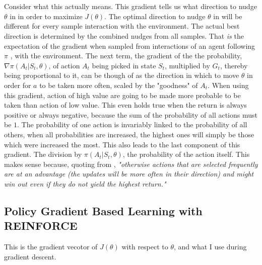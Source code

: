 \noindent
\\ \\ Consider what this actually means. This gradient tells us what direction to nudge $\theta$ in in order to maximize $J(\theta)$. The optimal direction to nudge $\theta$ in will be different for every sample interaction with the environment. The actual best direction is determined by the combined nudges from all samples. That \textit{is} the expectation of the gradient when sampled from interactions of an agent following $\pi$ , with the environment.
\nolinebreak
The next term, the gradient of the the probability, $\nabla \pi(A_t|S_t, \theta)$, of action $A_t$ being picked in state $S_t$, multiplied by $G_t$, thereby being proportional to it, can be though of as the direction in which to move $\theta$ in order for $a$ to be taken more often, scaled by the "goodness" of $A_t$. When using this gradient, action of high value are going to be made more probable to be taken than action of low value. This even holds true when the return is always positive or always negative, because the sum of the probability of all actions must be $1$. The probability of one action is invariably linked to the probability of all others, when all probabilities are increased, the highest ones will simply be those which were increased the most. This also leads to the last component of this gradient. The division by $\pi(A_t|S_t, \theta)$, the probability of the action itself. This makes sense because, quoting from , \textit{"otherwise actions that are selected frequently are at an advantage (the updates will be more often in their direction) and might win out even if they do not yield the highest return." }

\subsection{Policy Gradient Based Learning with REINFORCE}\label{subsec:pg:reinforce}
This is the gradient vecotor of $J(\theta)$ with respect to $\theta$, and what I use during gradient descent. 
